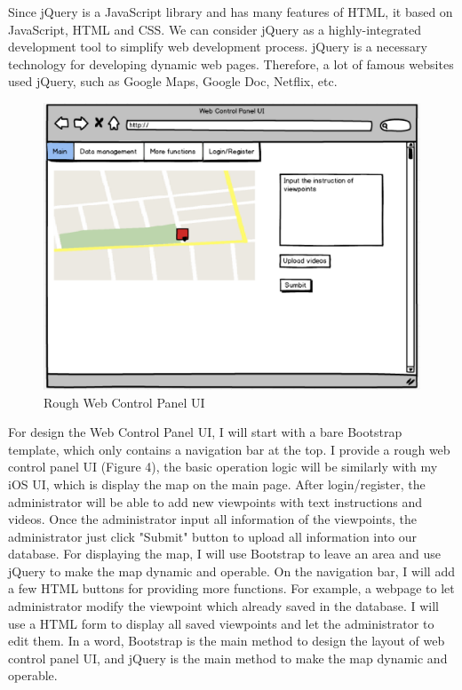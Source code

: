\documentclass[letterpaper, 10pt,titlepage]{article}
\begin{document}
Since jQuery is a JavaScript library and has many features of HTML, it based on JavaScript, HTML and CSS. We can consider jQuery as a highly-integrated development tool to simplify web development process. jQuery is a necessary technology for developing dynamic web pages. Therefore, a lot of famous websites used jQuery, such as Google Maps, Google Doc, Netflix, etc.

\begin{figure}[ht]
    \centering
    \includegraphics[scale=0.5]{j4}
    \caption{Rough Web Control Panel UI}
    \label{jiawei4}
\end{figure}

For design the Web Control Panel UI, I will start with a bare Bootstrap template, which only contains a navigation bar at the top. I provide a rough web control panel UI (Figure 4), the basic operation logic will be similarly with my iOS UI, which is display the map on the main page. After login/register, the administrator will be able to add new viewpoints with text instructions and videos. Once the administrator input all information of the viewpoints, the administrator just click "Submit" button to upload all information into our database. For displaying the map, I will use Bootstrap to leave an area and use jQuery to make the map dynamic and operable. On the navigation bar, I will add a few HTML buttons for providing more functions. For example, a webpage to let administrator modify the viewpoint which already saved in the database. I will use a HTML form to display all saved viewpoints and let the administrator to edit them. In a word, Bootstrap is the main method to design the layout of web control panel UI, and jQuery is the main method to make the map dynamic and operable.
\end{document}
